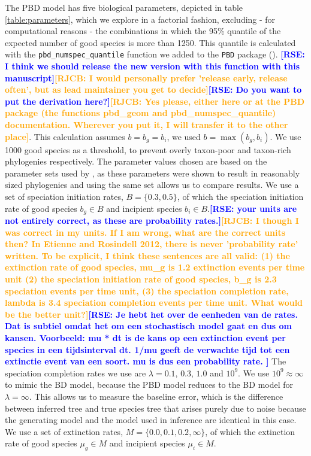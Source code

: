 \documentclass{article}
\newcommand*\RAMPAL[1]{\textcolor{blue}{\textbf{[RSE: #1]}}}
\newcommand*\richel[1]{\textcolor{orange}{\textbf{[RJCB: #1]}}}
\begin{document}

The PBD model has five biological parameters, depicted in table \ref{table:parameters}, 
which we explore in a factorial fashion, excluding - for computational reasons - the combinations in which the 
95\% quantile of the expected number of good species is more than 1250.
This quantile is
calculated with the \verb;pbd_numspec_quantile; function we added to the \verb;PBD; package (\cite{pbd}).
\RAMPAL{I think we should release the new version with this function with this manuscript}\richel{I would personally prefer 'release early, release often', but as lead maintainer you get to decide}\RAMPAL{Do you want to put the derivation here?}\richel{Yes please, either here or at the PBD package (the functions pbd\_geom and 
pbd\_numspec\_quantile) documentation. Wherever you put it, I will transfer it to the other place}. This calculation
assumes $b = b_g = b_i$, we used $b = \max(b_g, b_i)$.
We use 1000 good species as a threshold, to prevent overly taxon-poor and taxon-rich phylogenies respectively.
The parameter values chosen are based on the parameter sets used by 
\cite{etienne2014}, as these parameters were shown to result in reasonably
sized phylogenies and using the same set allows us to compare results. 
We use a set of speciation initiation rates, $B = \{0.3, 0.5\}$, of which the speciation initiation
rate of good species $b_g \in B$ and incipient species $b_i \in B$.\RAMPAL{your units are not entirely correct, as these are probability rates.}\richel{I though I was correct in my units. If I am wrong, what are the correct units then? In Etienne and Rosindell 2012, there is never 'probability rate' written. To be explicit, I think these sentences are all valid: (1) the extinction rate of good species, mu\_g is 1.2 extinction events per time unit (2) the speciation initiation rate of good species, b\_g is 2.3 speciation events per time unit, (3) the speciation completion rate, lambda is 3.4 speciation completion events per time unit. What would be the better unit?}\RAMPAL{
Je hebt het over de eenheden van de rates. Dat is subtiel omdat het om een stochastisch model gaat en dus om kansen. Voorbeeld: mu * dt is de kans op een extinction event per species in een tijdsinterval dt. 1/mu geeft de verwachte tijd tot een extinctie event van een soort. mu is dus een probability rate.
}
The speciation completion rates we use are $\lambda = 0.1$, $0.3$, $1.0$ and $10^9$. We use $10^9 \approx \infty$
to mimic the BD model, because the PBD model reduces to the BD model for $\lambda = \infty$.
This allows us to measure the baseline error, 
which is the difference between inferred tree and true species tree that arises purely due to noise 
because the generating model and the model used in inference are identical in this case.
We use a set of extinction rates, $M = \{0.0, 0.1, 0.2, \infty\}$, of which the extinction
rate of good species $\mu_g \in M$ and incipient species $\mu_i \in M$. 
\end{document}
